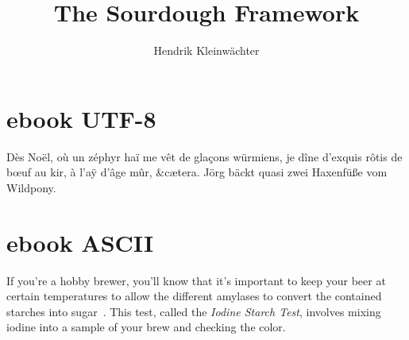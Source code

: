 \documentclass[paper=a4, twoside=false, fontsize=12pt, parskip=half,
                bibliography=totoc, listof=totoc]{scrbook}
\author{Hendrik Kleinwächter}
\title{The Sourdough Framework}
\begin{document}
%
\titlepage

{%
 \hypersetup{hidelinks}
 \ifdefined\HCode\else\tableofcontents\fi
}

\chapter{ebook UTF-8}
Dès Noël, où un zéphyr haï me vêt de glaçons würmiens, je dîne d’exquis rôtis
de bœuf au kir, à l’aÿ d’âge mûr, \&cætera.  Jörg bäckt quasi zwei Haxenfüße
vom Wildpony.

\chapter{ebook ASCII}
If you're a hobby brewer, you'll know that it's important to keep your beer at
certain temperatures to allow the different amylases to convert the contained
starches into sugar~\cite{beer+amylase}.
This test, called the \emph{Iodine Starch Test}, involves mixing iodine into
a sample of your brew and checking the color.

\printbibliography
\end{document}
